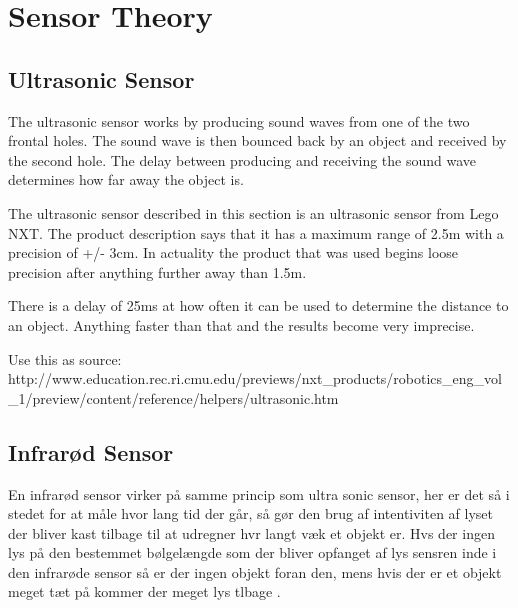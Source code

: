 \chapter{Sensor Theory}
\section{Ultrasonic Sensor}
The ultrasonic sensor works by producing sound waves from one of the two
frontal holes. The sound wave is then bounced back by an object and received by
the second hole. The delay between producing and receiving the sound wave
determines how far away the object is.

The ultrasonic sensor described in this section is an ultrasonic sensor from
Lego NXT. The product description says that it has a maximum range of 2.5m with
a precision of +/- 3cm. In actuality the product that was used begins loose
precision after anything further away than 1.5m.

There is a delay of 25ms at how often it can be used to determine the distance
to an object. Anything faster than that and the results become very imprecise.

Use this as source:
http://www.education.rec.ri.cmu.edu/previews/nxt_products/robotics_eng_vol_1/preview/content/reference/helpers/ultrasonic.htm

\section{Infrarød Sensor}
En infrarød sensor virker på samme princip som ultra sonic sensor, her er det så
i stedet for at måle hvor lang tid der går, så gør den brug af intentiviten af
lyset der bliver kast tilbage til at udregner hvr langt væk et objekt er. Hvs
der ingen lys på den bestemmet bølgelængde som der bliver opfanget af lys
sensren inde i den infrarøde sensor så er der ingen objekt foran den, mens hvis
der er et objekt meget tæt på kommer der meget lys tlbage \PS. 











